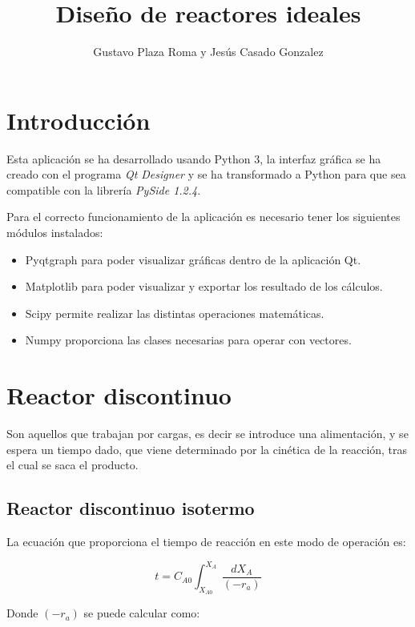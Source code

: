 \documentclass[20pt,a4paper]{extarticle}
\title{Diseño de reactores ideales}
\author{Gustavo Plaza Roma y Jesús Casado Gonzalez}
\begin{document}
\maketitle

\setcounter{tocdepth}{2} %

\section{Introducción}
	Esta aplicación se ha desarrollado usando Python 3, la interfaz gráfica se ha creado con el programa \textit{Qt Designer} y se ha transformado a Python para que sea compatible con la librería \textit{PySide 1.2.4}. 
	
	Para el correcto funcionamiento de la aplicación es necesario tener los siguientes módulos instalados:
	\begin{itemize}
		\item Pyqtgraph para poder visualizar gráficas dentro de la aplicación Qt.
		\item Matplotlib para poder visualizar y exportar los resultado de los cálculos.
		\item Scipy permite realizar las distintas operaciones matemáticas.
		\item Numpy proporciona las clases necesarias para operar con vectores.
	\end{itemize}


\section{Reactor discontinuo}
	
	Son aquellos que trabajan por cargas, es decir se introduce una alimentación, y se espera un tiempo dado, que viene determinado por la cinética de la reacción, tras el cual se saca el producto.
	
	\subsection{Reactor discontinuo isotermo}
		La ecuación que proporciona el tiempo de reacción en este modo de operación es:
		
		\begin{equation*}
			t = C_{A0}\int_{X_{A0}}^{X_A}\frac{dX_A}{(-r_a)}
		\end{equation*}
		
		Donde $(-r_a)$ se puede calcular como:
		
\end{document}
